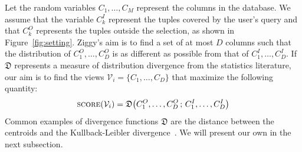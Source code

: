 \label{sec:problem}
Let the random variables $C_1, \ldots, C_M$ represent the co\-lumns in the
database.  We assume that the variable $C_k^I$ represent the tuples covered by
the user's query and that $C_k^O$ represents the tuples outside the selection,
as shown in Figure~\ref{fig:setting}.  Ziggy's aim is to find a set of at most
$D$ columns such that the distribution of $C_1^O, \ldots, C_D^O$ is as
different as possible from that of $C_1^I, \ldots, C_D^I$. If $\mathfrak{D}$
represents a measure of distribution divergence from the statistics literature,
our aim is to find the views $\mathcal{V}_i = \{C_1, \ldots, C_D\}$ that
maximize the following quantity:
\begin{equation}
    \label{eq:objective0}
    \textsc{score} (\mathcal{V}_i) = \mathfrak{D}\big( C_1^O, \ldots, C_D^O \,;\,
        C_1^I, \ldots, C_D^I \big)\\
\end{equation}
Common examples of divergence functions $\mathfrak{D}$ are the distance between
the centroids and the Kullback-Leibler divergence~\cite{wasserman2013all}.  We
will present our own in the next subsection.

